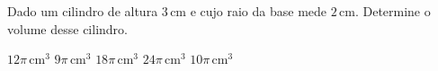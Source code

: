 Dado um cilindro de altura $3$\,cm e cujo raio da base mede $2$\,cm. Determine o volume desse cilindro.

$12\pi$\,cm$^3$
$9\pi$\,cm$^3$
$18\pi$\,cm$^3$
$24\pi$\,cm$^3$
$10\pi$\,cm$^3$



